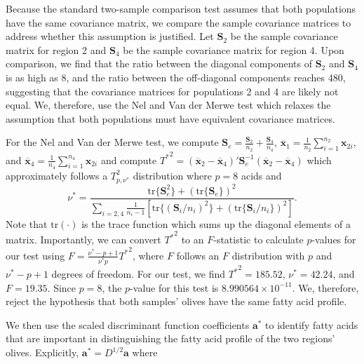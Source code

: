\documentclass[11pt]{article}
\newcommand{\m}[1]{\mathbf{\bm{#1}}}
\begin{document}
Because the standard two-sample comparison test assumes that both populations have the same covariance matrix, we compare the sample covariance matrices to address whether this assumption is justified. Let $\m{S}_2$ be the sample covariance matrix for region 2 and $\m{S}_4$ be the sample covariance matrix for region 4. Upon comparison, we find that the ratio between the diagonal components of $\m{S}_2$ and $\m{S}_4$ is as high as 8, and the ratio between the off-diagonal components reaches 480, suggesting that the covariance matrices for populations 2 and 4 are likely not equal. We, therefore, use the Nel and Van der Merwe test which relaxes the assumption that both populations must have equivalent covariance matrices.

For the Nel and Van der Merwe test, we compute $\m{S}_e = \frac{\m{S}_2}{n_2}+\frac{\m{S}_4}{n_4}$, $\overline{\m{x}}_1 = \frac{1}{n_2} \sum^{n_2}_{i=1} \m{x}_{2i}$, and $\overline{\m{x}}_4 = \frac{1}{n_4} \sum^{n_4}_{i=1} \m{x}_{2i}$ and compute ${T^*}^2 = (\overline{\m{x}}_2 - \overline{\m{x}}_4)' \m{S}^{-1}_e (\overline{\m{x}}_2 - \overline{\m{x}}_4)$ which approximately follows a $T^2_{p,\nu^*}$ distribution where $p=8$ acids and
\begin{equation*}
\nu^* = \frac{ \textrm{tr}\{\m{S}_e^2\} + (\textrm{tr}\{\m{S}_e\})^2}{\sum_{i=2,4} \frac{1}{n_i-1}\left[  \textrm{tr}\{(\m{S}_i/n_i)^2\} + (\textrm{tr}\{\m{S}_i/n_i\})^2  \right]}.
\end{equation*}
Note that $\mathrm{tr}(\cdot)$ is the trace function which sums up the diagonal elements of a matrix. Importantly, we can convert ${T^*}^2$ to an $F$-statistic to calculate $p$-values for our test using
$F= \frac{\nu^*-p+1}{\nu^* p} {T^*}^2$,
where $F$ follows an $F$ distribution with $p$ and $\nu^*-p+1$ degrees of freedom. For our test, we find ${T^*}^2=185.52$, $\nu^*=42.24$, and $F=19.35$. Since $p=8$, the $p$-value for this test is $8.990564\times10^{-11}$.  We, therefore, reject the hypothesis that both samples' olives have the same fatty acid profile. 

We then use the scaled discriminant function coefficients $\m{a}^*$ to identify fatty acids that are important in distinguishing the fatty acid profile of the two regions' olives.  Explicitly, $\m{a}^* = D^{1/2} \m{a}$ where
\end{document}
